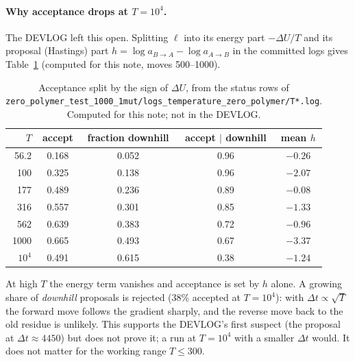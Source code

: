 \documentclass[11pt,a4paper]{article}
\newcommand{\dt}{\Delta t}
\newcommand{\file}[1]{\texttt{#1}}
\begin{document}
\paragraph{Why acceptance drops at $T=10^4$.} The DEVLOG left this open. Splitting
$\ell$ into its energy part $-\Delta U/T$ and its proposal (Hastings) part
$h=\log a_{B\to A}-\log a_{A\to B}$ in the committed logs gives
Table~\ref{tab:hastings} (computed for this note, moves 500--1000).
\begin{table}[t]
\centering
\begin{tabular}{@{}rcccc@{}}
\toprule
$T$ & accept & fraction downhill & accept $|$ downhill & mean $h$ \\
\midrule
56.2   & 0.168 & 0.052 & 0.96 & $-0.26$ \\
100    & 0.325 & 0.138 & 0.96 & $-2.07$ \\
177    & 0.489 & 0.236 & 0.89 & $-0.08$ \\
316    & 0.557 & 0.301 & 0.85 & $-1.33$ \\
562    & 0.639 & 0.383 & 0.72 & $-0.96$ \\
1000   & 0.665 & 0.493 & 0.67 & $-3.37$ \\
$10^4$ & 0.491 & 0.615 & 0.38 & $-1.24$ \\
\bottomrule
\end{tabular}
\caption{Acceptance split by the sign of $\Delta U$, from the status rows of
\file{zero\_polymer\_test\_1000\_1mut/logs\_temperature\_zero\_polymer/T*.log}.
Computed for this note; not in the DEVLOG.}
\label{tab:hastings}
\end{table}
At high $T$ the energy term vanishes and acceptance is set by $h$ alone. A
growing share of \emph{downhill} proposals is rejected (38\% accepted at
$T=10^4$): with $\dt\propto\sqrt T$ the forward move follows the gradient
sharply, and the reverse move back to the old residue is unlikely. This
supports the DEVLOG's first suspect (the proposal at $\dt\approx4450$) but
does not prove it; a run at $T=10^4$ with a smaller $\dt$ would. It does not
matter for the working range $T\le300$.
\end{document}
